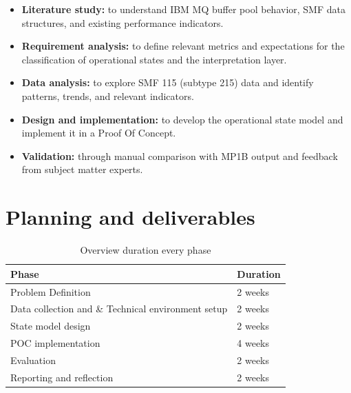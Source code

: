 \begin{itemize}
    \item \textbf{Literature study:} to understand IBM MQ buffer pool 
    behavior, SMF data structures, and existing performance indicators.
    
    \item \textbf{Requirement analysis:} to define relevant metrics and 
    expectations for the classification of operational states and the interpretation layer.
    
    \item \textbf{Data analysis:} to explore SMF 115 (subtype 215) data 
    and identify patterns, trends, and relevant indicators.
    
    \item \textbf{Design and implementation:} to develop the operational 
    state model and implement it in a Proof Of Concept.
    
    \item \textbf{Validation:} through manual comparison with MP1B output 
    and feedback from subject matter experts.
    
\end{itemize}






\section{Planning and deliverables}
\begin{table}[h]
    \centering
    \renewcommand{\arraystretch}{1.3}
    \begin{tabular}{|l|l|}
        \hline
        \textbf{Phase} & \textbf{Duration} \\
        \hline
         Problem Definition & 2 weeks  \\
        Data collection and \& Technical environment setup  & 2 weeks  \\
        State model design       & 2 weeks \\
        POC implementation          & 4 weeks \\
        Evaluation       & 2 weeks \\
        Reporting and reflection       & 2 weeks \\
        \hline    \end{tabular}
    \caption{Overview duration every phase}
\end{table}






